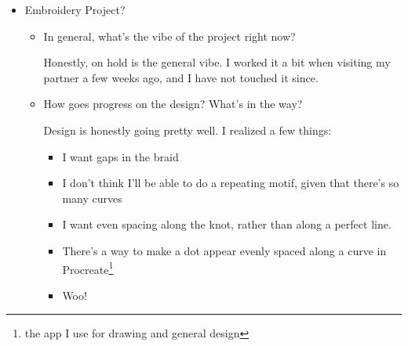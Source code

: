 \documentclass[12pt]{article}
\renewcommand{\,}{\textsuperscript{,}}
\begin{document}
\begin{itemize}
\begin{itemize}
\begin{itemize}
\item How goes listening?

Honestly really good.
I've been keeping up on album club.
I have listened through the weekly tracks that Apple Music gives me.\footnote{I know that I saw something about how someone doesn't want their music given to them by an algorithm, and I respect that. That being said, though, I do appreciate being able to find artists through the algorithm and then listening to more of their discography.}
I also started listening back through the recently favorited songs I have.
Part of me does really want to make a note here or somewhere about what in each song I find compelling.
Hmmm.

Let's make that today's post!

Eh, let's do that in the future.\footnote{added to the list}

\item Upon reflection, how goes music? Anything missed in those four questions?

Honestly music going well from consuming, not as well for producing.
Could ask about part writing and ear training.
Could ask about the e-recording, though I guess that kind of goes both in writing and recording.
Then again, since I think it goes in both, maybe it does need its own post.

\end{itemize}

\item Embroidery Project?

\begin{itemize}

\item In general, what's the vibe of the project right now?

Honestly, on hold is the general vibe.
I worked it a bit when visiting my partner a few weeks ago, and I have not touched it since.

\item How goes progress on the design? What's in the way?

Design is honestly going pretty well.
I realized a few things:

\begin{itemize}
\item I want gaps in the braid
\item I don't think I'll be able to do a repeating motif, given that there's so many curves
\item I want even spacing along the knot, rather than along a perfect line.
\item There's a way to make a dot appear evenly spaced along a curve in Procreate\footnote{the app I use for drawing and general design}
\item Woo!
\end{itemize}


\end{itemize}
\end{itemize}
\end{itemize}
\end{document}
